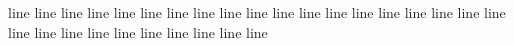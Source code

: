 line
line
line
line
line
line
line
line
line
line
line
line
line
line
line
line
line
line
line
line
line
line
line
line
line
line
line
line
line

